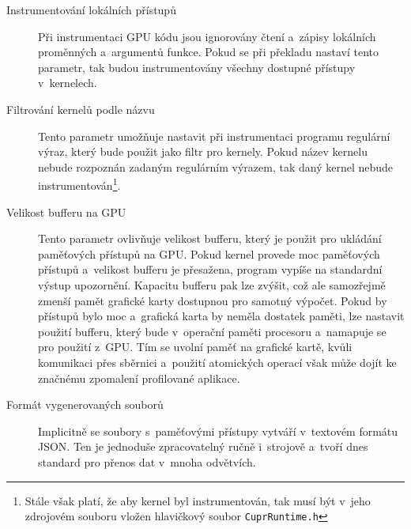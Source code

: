 \begin{description}
    \item[Instrumentování lokálních přístupů] Při instrumentaci GPU kódu jsou ignorovány čtení a~zápisy lokálních proměnných a~argumentů funkce. Pokud se při překladu nastaví tento parametr, tak budou instrumentovány všechny dostupné přístupy v~kernelech.
    \item[Filtrování kernelů podle názvu] Tento parametr umožňuje nastavit při instrumentaci programu regulární výraz, který bude použit jako filtr pro kernely. Pokud název kernelu nebude rozpoznán zadaným regulárním výrazem, tak daný kernel nebude instrumentován\footnote{Stále však platí, že aby kernel byl instrumentován, tak musí být v~jeho zdrojovém souboru vložen hlavičkový soubor \texttt{CuprRuntime.h}}.
    \item[Velikost bufferu na GPU] Tento parametr ovlivňuje velikost bufferu, který je použit pro ukládání paměťových přístupů na GPU. Pokud kernel provede moc paměťových přístupů a~velikost bufferu je přesažena, program vypíše na standardní výstup upozornění. Kapacitu bufferu pak lze zvýšit, což ale samozřejmě zmenší pamět grafické karty dostupnou pro samotný výpočet. Pokud by přístupů bylo moc a~grafická karta by neměla dostatek paměti, lze nastavit použití bufferu, který bude v~operační paměti procesoru a~namapuje se pro použití z~GPU. Tím se uvolní paměť na grafické kartě, kvůli komunikaci přes sběrnici a~použití atomických operací však může dojít ke značnému zpomalení profilované aplikace.
    \item[Formát vygenerovaných souborů] Implicitně se soubory s~paměťovými přístupy vytváří v~textovém formátu JSON. Ten je jednoduše zpracovatelný ručně i~strojově a~tvoří dnes standard pro přenos dat v~mnoha odvětvích.

\end{description}

